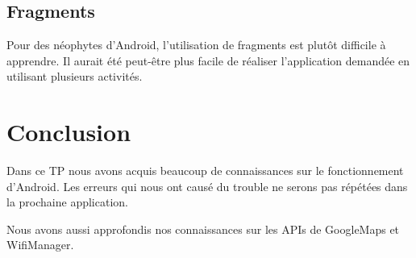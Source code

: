 \documentclass[12pt]{article}
\begin{document}
\subsection{Fragments}

	Pour des néophytes d'Android, l'utilisation de fragments est plutôt
	difficile à apprendre.  Il aurait été peut-être plus facile de réaliser
	l'application demandée en utilisant plusieurs activités.

\section{Conclusion}

	Dans ce TP nous avons acquis beaucoup de connaissances sur le fonctionnement
	d'Android.  Les erreurs qui nous ont causé du trouble ne serons pas répétées
	dans la prochaine application.

	Nous avons aussi approfondis nos connaissances sur les APIs de GoogleMaps et
	WifiManager.

\begin{raggedright}


\end{raggedright}
\end{document}
